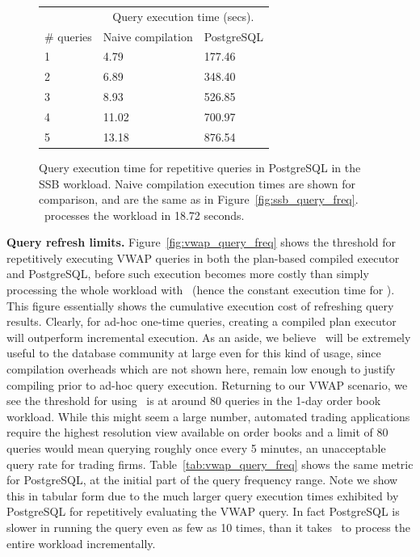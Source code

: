 \begin{figure}
\begin{center}
\begin{tabular}{|l|l|l|}
\hline
& \multicolumn{2}{c|}{Query execution time (secs).} \\
\# queries & Naive compilation & PostgreSQL \\
\hline
1 & 4.79 & 177.46 \\
2 & 6.89 & 348.40 \\
3 & 8.93 & 526.85 \\
4 & 11.02 & 700.97 \\
5 & 13.18 & 876.54 \\
\hline 
\end{tabular}
\end{center}
\caption{Query execution time for repetitive queries in PostgreSQL in the SSB
workload. Naive compilation execution times are shown for comparison, and are
the same as in Figure~\ref{fig:ssb_query_freq}. \compiler\ processes the
workload in 18.72 seconds.}
\label{tab:ssb_query_freq}
\end{figure}


\textbf{Query refresh limits.}
Figure~\ref{fig:vwap_query_freq} shows the threshold for repetitively executing
VWAP queries in both the plan-based compiled executor and PostgreSQL, before such
execution becomes more costly than simply processing the whole workload with
\compiler\ (hence the constant execution time for \compiler). This figure
essentially shows the cumulative execution cost of refreshing query results.
Clearly, for ad-hoc one-time queries, creating a compiled plan executor will
outperform incremental execution. As an aside, we believe \compiler\ will be
extremely useful to the database community at large even for this kind of usage,
since compilation overheads which are not shown here, remain low enough to
justify compiling prior to ad-hoc query execution. Returning to our VWAP
scenario, we see the threshold for using \compiler\ is at around 80 queries in
the 1-day order book workload. While this might seem a large number, automated
trading applications require the highest resolution view available on order books
and a limit of 80 queries would mean querying roughly once every 5 minutes, an
unacceptable query rate for trading firms. Table~\ref{tab:vwap_query_freq}
shows the same metric for PostgreSQL, at the initial part of the query
frequency range. Note we show this in tabular form due to the much larger query
execution times exhibited by PostgreSQL for repetitively evaluating the VWAP
query. In fact PostgreSQL is slower in running the query even as few as 10
times, than it takes \compiler\ to process the entire workload incrementally.

